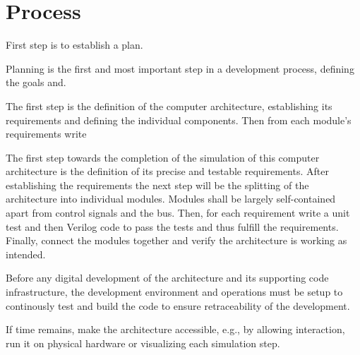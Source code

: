 \chapter{Process}

First step is to establish a plan. 

Planning is the first and most important step in a development process, defining the goals and.

The first step is the definition of the computer architecture, establishing its requirements and defining the individual components. Then from each module's requirements write

The first step towards the completion of the simulation of this computer architecture is the definition of its precise and testable requirements. After establishing the requirements the next step will be the splitting of the architecture into individual modules. Modules shall be largely self-contained apart from control signals and the bus. Then, for each requirement write a unit test and then Verilog code to pass the tests and thus fulfill the requirements. Finally, connect the modules together and verify the architecture is working as intended. 

Before any digital development of the architecture and its supporting code infrastructure, the development environment and operations must be setup to continously test and build the code to ensure retraceability of the development.

If time remains, make the architecture accessible, e.g., by allowing interaction, run it on physical hardware or visualizing each simulation step.

 



